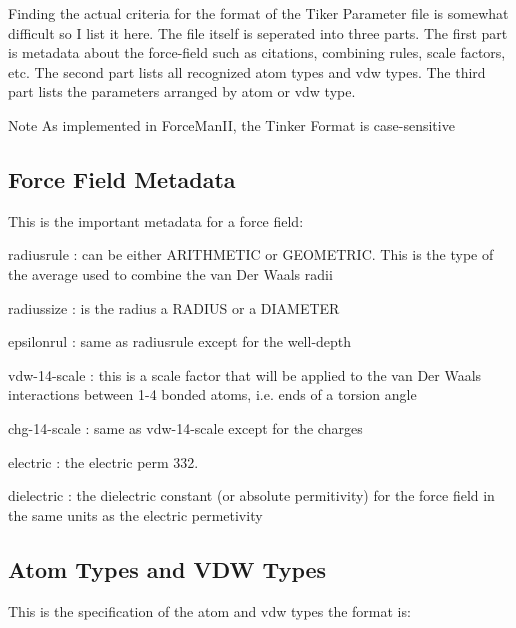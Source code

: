 Finding the actual criteria for the format of the Tiker Parameter file is somewhat difficult so I list it here. The file itself is seperated into three parts. The first part is metadata about the force-\/field such as citations, combining rules, scale factors, etc. The second part lists all recognized atom types and vdw types. The third part lists the parameters arranged by atom or vdw type.

\begin{DoxyNote}{Note}
As implemented in Force\+Man\+II, the Tinker Format is case-\/sensitive
\end{DoxyNote}
\subsection*{Force Field Metadata}

This is the important metadata for a force field\+:


\begin{DoxyItemize}
\item {\ttfamily radiusrule} \+: can be either {\ttfamily A\+R\+I\+T\+H\+M\+E\+T\+IC} or {\ttfamily G\+E\+O\+M\+E\+T\+R\+IC}. This is the type of the average used to combine the van Der Waals radii
\item {\ttfamily radiussize} \+: is the radius a {\ttfamily R\+A\+D\+I\+US} or a {\ttfamily D\+I\+A\+M\+E\+T\+ER}
\item {\ttfamily epsilonrul} \+: same as {\ttfamily radiusrule} except for the well-\/depth
\item {\ttfamily vdw-\/14-\/scale} \+: this is a scale factor that will be applied to the van Der Waals interactions between 1-\/4 bonded atoms, i.\+e. ends of a torsion angle
\item {\ttfamily chg-\/14-\/scale} \+: same as {\ttfamily vdw-\/14-\/scale} except for the charges
\item {\ttfamily electric} \+: the electric perm 332.
\item {\ttfamily dielectric} \+: the dielectric constant (or absolute permitivity) for the force field in the same units as the electric permetivity
\end{DoxyItemize}

\subsection*{Atom Types and V\+DW Types}

This is the specification of the atom and vdw types the format is\+:


